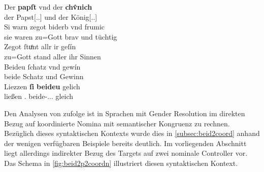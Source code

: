 \begin{exe}
\ex\label{ex:papstkoenig5} %
	\gll Der \textbf{papſt} vnd der \textbf{chv̂nich} \\
		der Papst[\Nom.\Sg.\MascM] und der König[\Nom.\Sg.\MascM] \\
\sn \gll Si warn zegot biderb vnd frumic \\
		sie waren {zu=Gott} brav und tüchtig \\
\sn \gll Zegot ſtuͦnt allr ir geſín \\
		{zu=Gott} stand aller ihr Sinnen \\
\sn \gll Beideu ſchatz vnd gewín \\
		beide Schatz und Gewinn \\
\sn \gll Liezzen \textbf{ſi} \textbf{beideu} gelich \\
		ließen \Tpl\subM.\Nom{} beide-\Nom.\Pl.\NeutM.\St{} gleich \\
	\begin{taggedline}{\parencites[\pno~17\vb, 30--34]{kc:B1}[vgl. abweichend][6110--6113]{schroeder1895}}
	\trans {}
	\end{taggedline}
\end{exe}

Den Analysen von \citet{wechsler2009,wechslerzlatic2003} zufolge ist in
Sprachen mit Gender Resolution im direkten Bezug auf koordinierte Nomina mit
semantischer Kongruenz zu rechnen. Bezüglich dieses syntaktischen Kontexts
wurde dies in \cref{subsec:beid2coord} anhand der wenigen verfügbaren Beispiele
bereits deutlich. Im vorliegenden Abschnitt liegt allerdings indirekter
Bezug des Targets  auf zwei nominale Controller vor. Das Schema
in \cref{fig:beid2p2coordn} illustriert diesen syntaktischen Kontext.

